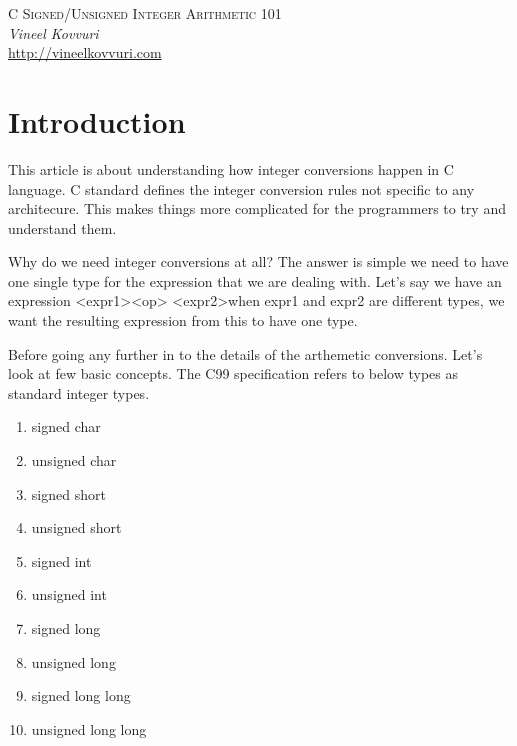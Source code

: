 \documentclass{article}
\begin{document}
\begin{titlepage}
   \begin{center}
      \Large\textsc{C Signed/Unsigned Integer Arithmetic 101}\\
      \vspace{5mm}
      \Large\textit{Vineel Kovvuri}\\
      \url{http://vineelkovvuri.com}\\
   \end{center}
\end{titlepage}

\tableofcontents

\newpage
\section{Introduction}
This article is about understanding how integer conversions happen in C
language. C standard defines the integer conversion rules not specific to any
architecure. This makes things more complicated for the programmers to try and
understand them.

Why do we need integer conversions at all? The answer is simple we need to have
one single type for the expression that we are dealing with. Let's say we have
an expression \textless expr1\textgreater \textless op\textgreater
\textless expr2\textgreater  when expr1 and expr2 are different types, we
want the resulting expression from this to have one type.

Before going any further in to the details of the arthemetic conversions. Let's
look at few basic concepts. The C99 specification refers to below types as
standard integer types.

\begin{enumerate}[noitemsep]
    \item signed char
    \item unsigned char
    \item signed short
    \item unsigned short
    \item signed int
    \item unsigned int
    \item signed long
    \item unsigned long
    \item signed long long
    \item unsigned long long
\end{enumerate}
\end{document}

